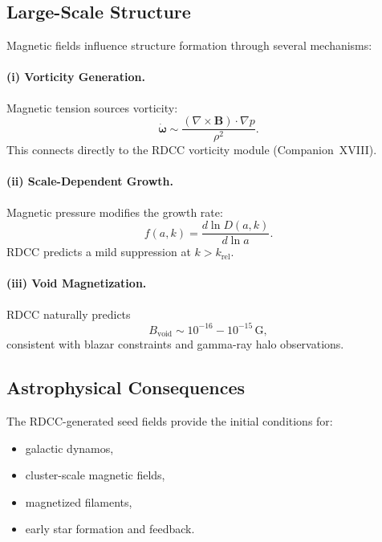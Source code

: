 \documentclass[11pt,a4paper]{article}
\begin{document}
\subsection{Large-Scale Structure}

Magnetic fields influence structure formation through several mechanisms:

\paragraph{(i) Vorticity Generation.}
Magnetic tension sources vorticity:
\begin{equation}
\dot{\boldsymbol{\omega}}
\sim
\frac{(\nabla \times \mathbf{B}) \cdot \nabla p}{\rho^{2}}.
\end{equation}
This connects directly to the RDCC vorticity module (Companion~XVIII).

\paragraph{(ii) Scale-Dependent Growth.}
Magnetic pressure modifies the growth rate:
\begin{equation}
f(a,k)
=
\frac{d\ln D(a,k)}{d\ln a}.
\end{equation}
RDCC predicts a mild suppression at $k > k_{\mathrm{rel}}$.

\paragraph{(iii) Void Magnetization.}
RDCC naturally predicts
\begin{equation}
B_{\mathrm{void}}
\sim
10^{-16} - 10^{-15}\,\mathrm{G},
\end{equation}
consistent with blazar constraints and gamma-ray halo observations.

\subsection{Astrophysical Consequences}

The RDCC-generated seed fields provide the initial conditions for:
\begin{itemize}
\item galactic dynamos,
\item cluster-scale magnetic fields,
\item magnetized filaments,
\item early star formation and feedback.
\end{itemize}
\end{document}

